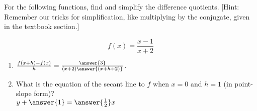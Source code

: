 \documentclass{ximera}
\author{Elizabeth Campolongo}
\begin{document}
\begin{exercise}

For the following functions, 
find and simplify the difference quotients. [Hint: Remember our tricks for simplification, like multiplying by the conjugate, given in the textbook section.]

$$f(x)= \frac{x-1}{x+2}$$

\begin{enumerate}

\item $\frac{f(x+h)-f(x)}{h} = \frac{\answer{3}}{(x+2)\answer{(x+h+2)}}$.  

\item What is the equation of the secant line to $f$ when $x = 0$ and $h=1$ (in point-slope form)?\\
$y+ \answer{1} = \answer{\frac{1}{2}}x$
	
\end{enumerate}
\end{exercise}
\end{document}

